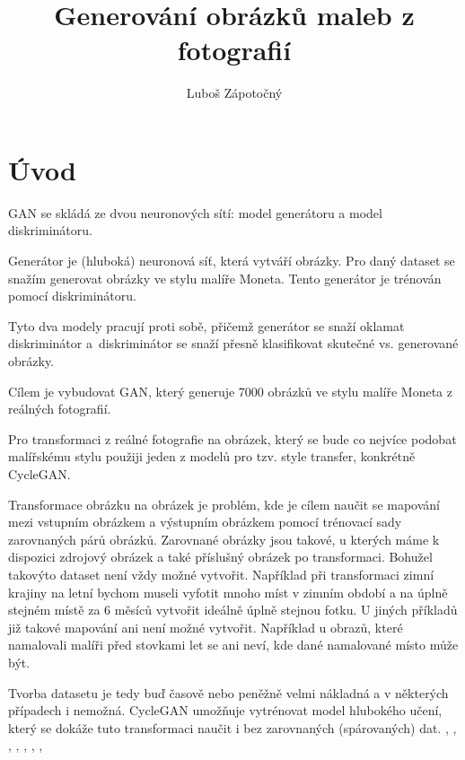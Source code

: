 \documentclass[czech]{mvi-report}
\title{Generování obrázků maleb z fotografií}
\author{Luboš Zápotočný}
\affiliation{ČVUT - FIT}
\begin{document}
\maketitle

\section{Úvod}
GAN se skládá ze dvou neuronových sítí: model generátoru a model diskriminátoru.

Generátor je (hluboká) neuronová síť, která vytváří obrázky. Pro daný dataset se snažím generovat obrázky ve stylu malíře Moneta. Tento generátor je trénován pomocí diskriminátoru.

Tyto dva modely pracují proti sobě, přičemž generátor se snaží oklamat diskriminátor a~diskriminátor se snaží přesně klasifikovat skutečné vs. generované obrázky.

Cílem je vybudovat GAN, který generuje 7000 obrázků ve stylu malíře Moneta z reálných fotografií.

Pro transformaci z reálné fotografie na obrázek, který se bude co nejvíce podobat malířskému stylu použiji jeden z modelů pro tzv. style transfer, konkrétně CycleGAN.

Transformace obrázku na obrázek je problém, kde je cílem naučit se mapování mezi vstupním obrázkem a výstupním obrázkem pomocí trénovací sady zarovnaných párů obrázků. Zarovnané obrázky jsou takové, u kterých máme k dispozici zdrojový obrázek a také příslušný obrázek po transformaci. Bohužel takovýto dataset není vždy možné vytvořit. Například při transformaci zimní krajiny na letní bychom museli vyfotit mnoho míst v zimním období a na úplně stejném místě za 6 měsíců vytvořit ideálně úplně stejnou fotku. U jiných příkladů již takové mapování ani není možné vytvořit. Například u obrazů, které namalovali malíři před stovkami let se ani neví, kde dané namalované místo může být.

Tvorba datasetu je tedy buď časově nebo peněžně velmi nákladná a v některých případech i nemožná. CycleGAN umožňuje vytrénovat model hlubokého učení, který se dokáže tuto transformaci naučit i bez zarovnaných (spárovaných) dat. \cite{GAN}, \cite{CycleGAN}, \cite{mosquera_2020}, \cite{kikaben_2022}, \cite{brownlee_2020_cyclegan}, \cite{brownlee_2020_conv}, \cite{brownlee_2019_batch}, \cite{brownlee_2019_norm}

\end{document}
